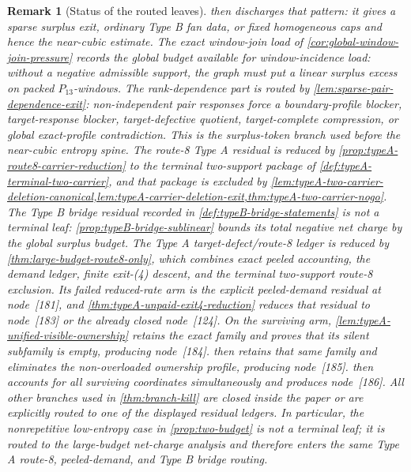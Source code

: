 \documentclass[11pt]{article}
\newtheorem{remark}[theorem]{Remark}
\begin{document}
\begin{remark}[Status of the routed leaves]
then discharges that pattern: it gives a sparse surplus exit, ordinary Type B
fan data, or fixed homogeneous caps and hence the near-cubic estimate.  The exact
window-join load of \cref{cor:global-window-join-pressure} records the
global budget available for window-incidence load: without a negative
admissible support, the graph must put a linear surplus excess on packed
\(P_{13}\)-windows.  The rank-dependence part is routed by
\cref{lem:sparse-pair-dependence-exit}: non-independent pair responses force a
boundary-profile blocker, target-response blocker, target-defective quotient,
target-complete compression, or global exact-profile contradiction.  This is
the surplus-token branch used before the near-cubic entropy spine.  The
route-8 Type A residual is reduced by
\cref{prop:typeA-route8-carrier-reduction} to the terminal two-support package
of \cref{def:typeA-terminal-two-carrier}, and that package is excluded by
\cref{lem:typeA-two-carrier-deletion-canonical,lem:typeA-carrier-deletion-exit,thm:typeA-two-carrier-nogo}.
The Type B bridge residual recorded in \cref{def:typeB-bridge-statements} is not
a terminal leaf: \cref{prop:typeB-bridge-sublinear} bounds its total negative
net charge by the global surplus budget.  The Type A target-defect/route-8
ledger is reduced by \cref{thm:large-budget-route8-only}, which combines exact
peeled accounting, the demand ledger, finite exit-\textup{(4)} descent, and the
terminal two-support route-8 exclusion.  Its failed reduced-rate arm is the
explicit peeled-demand residual at node~[181], and
\cref{thm:typeA-unpaid-exit4-reduction} reduces that residual to node~[183] or
the already closed node~[124].  On the surviving arm,
\cref{lem:typeA-unified-visible-ownership} retains the exact family and proves
that its silent subfamily is empty, producing node~[184].
 then retains that same family and
eliminates the non-overloaded ownership profile, producing node~[185].
 then accounts for all surviving
coordinates simultaneously and produces node~[186].  All other branches used in
\cref{thm:branch-kill} are closed inside the paper or are explicitly routed to
one of the displayed residual ledgers.
In particular, the nonrepetitive low-entropy case in \cref{prop:two-budget} is
not a terminal leaf; it is routed to the large-budget net-charge analysis and
therefore enters the same Type A route-8, peeled-demand, and Type B bridge
routing.
\end{remark}
\end{document}
